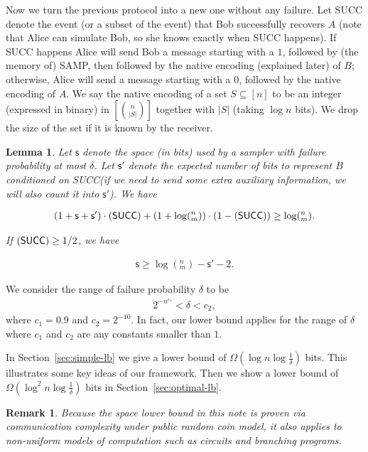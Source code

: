 \documentclass[10pt]{article}
\newtheorem{lemma}{Lemma}
\newtheorem{remark}{Remark}
\let\Pr\relax
\DeclareMathOperator*{\Pr}{\mathbb{P}}
\newcommand{\samp}{\textsf{SAMP}\xspace}
\newcommand{\success}{\textsf{SUCC}\xspace}
\newcommand{\s}{\textsf{s}\xspace}
\begin{document}
Now we turn the previous protocol into a new one without any failure. Let \success denote the event (or a subset of the event) that Bob successfully recovers $A$ (note that Alice can simulate Bob, so she knows exactly when \success happens). If \success happens Alice will send Bob a message starting with a $1$, followed by (the memory of) \samp, then followed by the native encoding (explained later) of $B$; otherwise, Alice will send a message starting with a $0$, followed by the native encoding of $A$. We say the native encoding of a set $S\subseteq [n]$ to be an integer (expressed in binary) in $[{n \choose |S|}]$ together with $|S|$ (taking $\log n$ bits). We drop the size of the set if it is known by the receiver.

\begin{lemma} \label{lemma:lb-meta}
  Let $\s$ denote the space (in bits) used by a sampler with failure probability at most $\delta$. Let $\s'$ denote the expected number of bits to represent $B$ conditioned on \success (if we need to send some extra auxiliary information, we will also count it into $\s'$). We have 
  
  \begin{align}
  (1+\s+\s')\cdot \Pr(\success)+(1+\log (^n_m)) \cdot (1-\Pr(\success)) \ge \log (^n_m).
  \end{align} 
  
  If $\Pr(\success)\ge 1/2$, we have 
  
  \begin{align} \label{formula:lb-meta}
  \s\ge \log (^n_m) - \s' - 2.
  \end{align} 
\end{lemma}

We consider the range of failure probability $\delta$ to be 
\begin{align} \label{formula:delta-range}
2^{-n^{c_1}}<\delta<c_2,
\end{align}
where $c_1=0.9$ and $c_2=2^{-10}$. In fact, our lower bound applies for the range of $\delta$ where $c_1$ and $c_2$ are any constants smaller than $1$. 

In Section~\ref{sec:simple-lb} we give a lower bound of $\Omega(\log n \log \frac{1}{\delta})$ bits. This illustrates some key ideas of our framework. Then we show a lower bound of $\Omega(\log^2 n \log \frac{1}{\delta})$ bits in Section~\ref{sec:optimal-lb}.

\begin{remark}
  Because the space lower bound in this note is proven via communication complexity under public random coin model, it also applies to non-uniform models of computation such as circuits and branching programs.  
\end{remark}
\end{document}
